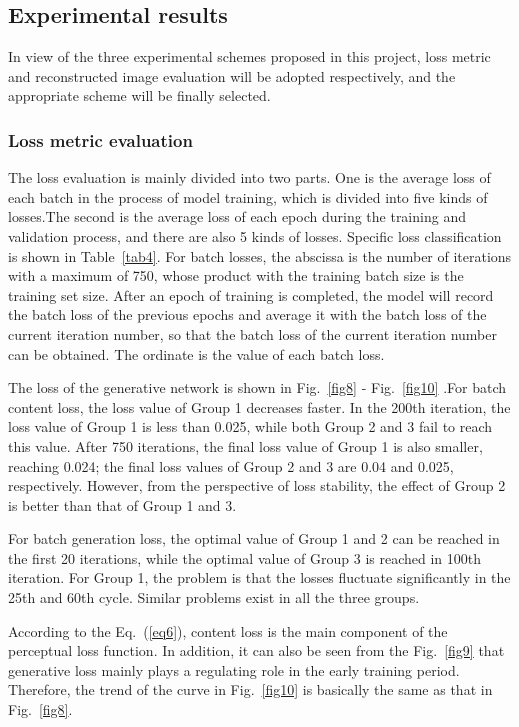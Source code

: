 \documentclass[10pt,twocolumn,letterpaper]{article}
\begin{document}
\subsection{Experimental results}
In view of the three experimental schemes proposed in this project,  loss metric and reconstructed image evaluation will be adopted respectively, and the appropriate scheme will be finally selected.

\subsubsection{Loss metric evaluation}
The loss evaluation is mainly divided into two parts. One is the average loss of each batch in the process of model training, which is divided into five kinds of losses.The second is the average loss of each epoch during the training and validation process, and there are also 5 kinds of losses. Specific loss classification is shown in Table~\ref{tab4}. For batch losses, the abscissa is the number of iterations with a maximum of 750, whose product with the training batch size is the training set size. After an epoch of training is completed, the model will record the batch loss of the previous epochs and average it with the batch loss of the current iteration number, so that the batch loss of the current iteration number can be obtained. The ordinate is the value of each batch loss.
 
The loss of the generative network is shown in Fig.~\ref{fig8} - Fig.~\ref{fig10} .For batch content loss, the loss value of Group 1 decreases faster. In the 200th iteration, the loss value of Group 1 is less than 0.025, while both Group 2 and 3 fail to reach this value. After 750 iterations, the final loss value of Group 1 is also smaller, reaching 0.024; the final loss values of Group 2 and 3 are 0.04 and 0.025, respectively. However, from the perspective of loss stability, the effect of Group 2 is better than that of Group 1 and 3.

For batch generation loss, the optimal value of Group 1 and 2 can be reached in the first 20 iterations, while the optimal value of Group 3 is reached in 100th iteration. For Group 1, the problem is that the losses fluctuate significantly in the 25th and 60th cycle. Similar problems exist in all the three groups.
 
According to the Eq.~(\ref{eq6}), content loss is the main component of the perceptual loss function. In addition, it can also be seen from the Fig.~\ref{fig9} that generative loss mainly plays a regulating role in the early training period. Therefore, the trend of the curve in Fig.~\ref{fig10} is basically the same as that in Fig.~\ref{fig8}.
 
\end{document}
